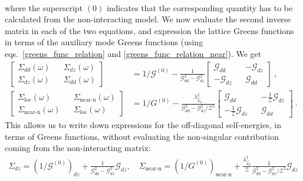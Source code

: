 \documentclass[reprint,hidelinks]{revtex4-2}
\begin{document}
\begin{widetext}
\begin{equation}
\begin{aligned}
\end{aligned}\end{equation}
where the superscript \((0)\) indicates that the corresponding quantity has to be calculated from the non-interacting model. We now evaluate the second inverse matrix in each of the two equations, and expression the lattice Greens functions in terms of the auxiliary mode Greens functions (using eqs.~\ref{greens_func_relation} and \ref{greens_func_relation_near}). We get
\begin{equation}\begin{aligned}
	\begin{bmatrix} \Sigma_{dd}(\omega) && \Sigma_{dz}(\omega) \\ \Sigma_{dz}(\omega) && \Sigma_{dd}(\omega)\end{bmatrix} &= 1/\mathcal{G}^{(0)} - \frac{1}{\mathcal{G}_{dd}^2 - \mathcal{G}_{dz}^2}\begin{bmatrix} \mathcal{G}_{dd} && -\mathcal{G}_{dz} \\ -\mathcal{G}_{dz} && \mathcal{G}_{dd}\end{bmatrix}~,\\
	\begin{bmatrix} \Sigma_\text{loc}(\omega) && \Sigma_\text{near-n}(\omega) \\ \Sigma_\text{near-n}(\omega) && \Sigma_\text{loc}(\omega)\end{bmatrix} &= 1/G^{(0)} - \frac{\lambda_{\vec k_0}^2}{\mathcal{G}_{dd}^2 - \mathcal{G}_{dz}^2 / \mathcal{Z}^2}\begin{bmatrix} \mathcal{G}_{dd} && -\frac{1}{\mathcal{Z}}\mathcal{G}_{dz} \\ -\frac{1}{\mathcal{Z}}\mathcal{G}_{dz} && \mathcal{G}_{dd}\end{bmatrix}~.
\end{aligned}\end{equation}
This allows us to write down expressions for the off-diagonal self-energies, in terms of Greens functions, without evaluating the non-singular contribution coming from the non-interacting matrix:
\begin{equation}\begin{aligned}
	\Sigma_{dz} = \left(1/\mathcal{G}^{(0)}\right)_{dz} + \frac{1}{\mathcal{G}_{dd}^2 - \mathcal{G}_{dz}^2} \mathcal{G}_{dz},\quad \Sigma_\text{near-n} = \left(1/G^{(0)}\right)_\text{near-n} + \frac{\lambda_{\vec k_0}^2}{\mathcal{Z}}\frac{1}{\mathcal{G}_{dd}^2 - \mathcal{G}_{dz}^2 / \mathcal{Z}^2} \mathcal{G}_{dz}
\end{aligned}\end{equation}

\end{widetext}
\end{document}
